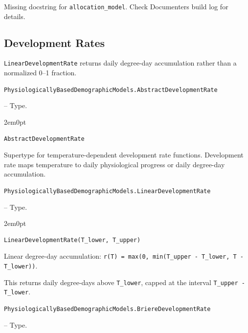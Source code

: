 \begin{tcolorbox}[toptitle=-1mm,bottomtitle=1mm,colback=admonition-warning!50!white,colframe=admonition-warning,title=\textbf{Missing docstring.}]
Missing docstring for \texttt{allocation\_model}. Check Documenter{\textquotesingle}s build log for details.

\end{tcolorbox}


\subsection{Development Rates}



\label{3026509006758552390}{}


\texttt{LinearDevelopmentRate} returns daily degree-day accumulation rather than a normalized 0–1 fraction.


\hypertarget{8034633395955112966}{\texttt{PhysiologicallyBasedDemographicModels.AbstractDevelopmentRate}}  -- {Type.}

\begin{adjustwidth}{2em}{0pt}


\begin{verbatim}
AbstractDevelopmentRate
\end{verbatim}

Supertype for temperature-dependent development rate functions. Development rate maps temperature to daily physiological progress or daily degree-day accumulation.



\end{adjustwidth}
\hypertarget{1845897617306325512}{\texttt{PhysiologicallyBasedDemographicModels.LinearDevelopmentRate}}  -- {Type.}

\begin{adjustwidth}{2em}{0pt}


\begin{verbatim}
LinearDevelopmentRate(T_lower, T_upper)
\end{verbatim}

Linear degree-day accumulation: \texttt{r(T) = max(0, min(T\_upper - T\_lower, T - T\_lower))}.

This returns daily degree-days above \texttt{T\_lower}, capped at the interval \texttt{T\_upper - T\_lower}.



\end{adjustwidth}
\hypertarget{17313924728642623655}{\texttt{PhysiologicallyBasedDemographicModels.BriereDevelopmentRate}}  -- {Type.}


